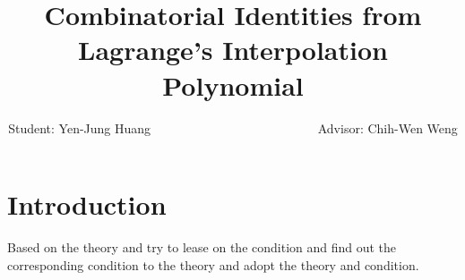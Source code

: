 \documentclass[12pt]{report}%
\title{Combinatorial Identities from Lagrange's Interpolation Polynomial}
\author{Student: Yen-Jung Huang  ~~~~~~~~~~~~~~~~~~~~~~~~~~Advisor: Chih-Wen Weng}
\date{} %
\theoremstyle{plain}
\theoremstyle{definition}
\begin{document}

\chapter{Introduction}
\normalsize
{}
Based on the theory and try to lease on the condition and find out the corresponding condition to the theory and adopt the theory and condition.
\end{document}
